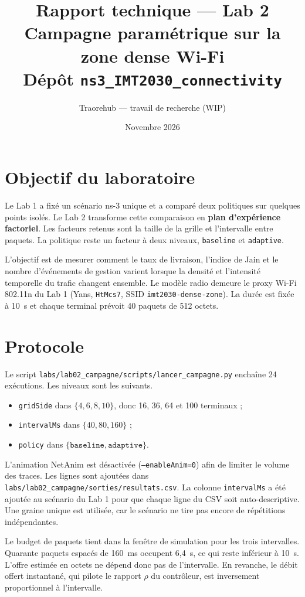 \documentclass[11pt,a4paper]{article}
\title{Rapport technique --- Lab 2\\
\large Campagne paramétrique sur la zone dense Wi-Fi\\
Dépôt \texttt{ns3\_IMT2030\_connectivity}}
\author{Traorehub --- travail de recherche (WIP)}
\date{Novembre 2026}
\begin{document}
\maketitle
\tableofcontents
\newpage

\section{Objectif du laboratoire}

Le Lab 1 a fixé un scénario ns-3 unique et a comparé deux politiques sur quelques points isolés. Le Lab 2 transforme cette comparaison en \textbf{plan d'expérience factoriel}. Les facteurs retenus sont la taille de la grille et l'intervalle entre paquets. La politique reste un facteur à deux niveaux, \texttt{baseline} et \texttt{adaptive}.

L'objectif est de mesurer comment le taux de livraison, l'indice de Jain et le nombre d'événements de gestion varient lorsque la densité et l'intensité temporelle du trafic changent ensemble. Le modèle radio demeure le proxy Wi-Fi 802.11n du Lab 1 (Yans, \texttt{HtMcs7}, SSID \texttt{imt2030-dense-zone}). La durée est fixée à 10~s et chaque terminal prévoit 40 paquets de 512 octets.

\section{Protocole}

Le script \texttt{labs/lab02\_campagne/scripts/lancer\_campagne.py} enchaîne 24 exécutions. Les niveaux sont les suivants.
\begin{itemize}
  \item \texttt{gridSide} dans $\{4, 6, 8, 10\}$, donc 16, 36, 64 et 100 terminaux ;
  \item \texttt{intervalMs} dans $\{40, 80, 160\}$ ;
  \item \texttt{policy} dans $\{\texttt{baseline}, \texttt{adaptive}\}$.
\end{itemize}

L'animation NetAnim est désactivée (\texttt{--enableAnim=0}) afin de limiter le volume des traces. Les lignes sont ajoutées dans \texttt{labs/lab02\_campagne/sorties/resultats.csv}. La colonne \texttt{intervalMs} a été ajoutée au scénario du Lab 1 pour que chaque ligne du CSV soit auto-descriptive. Une graine unique est utilisée, car le scénario ne tire pas encore de répétitions indépendantes.

Le budget de paquets tient dans la fenêtre de simulation pour les trois intervalles. Quarante paquets espacés de 160~ms occupent 6,4~s, ce qui reste inférieur à 10~s. L'offre estimée en octets ne dépend donc pas de l'intervalle. En revanche, le débit offert instantané, qui pilote le rapport $\rho$ du contrôleur, est inversement proportionnel à l'intervalle.
\end{document}
